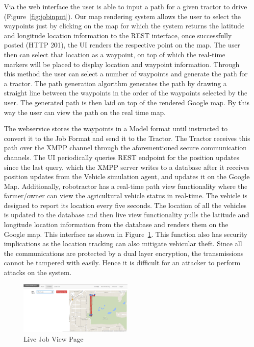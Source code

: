 \documentclass[conference,12pt]{IEEEtran}
\begin{document}
Via the web interface the user is able to input a path for a given tractor to
drive (Figure~\ref{fig:jobinput}). Our map
rendering system allows the user to select the waypoints just by clicking on the
map for which the system returns the latitude and longitude location information
to the REST interface, once successfully posted (HTTP 201), the UI renders the
respective point on the map. The user then can select that location as a waypoint, on top of
which the real-time markers will be placed to display location and waypoint
information. Through this method the user can select a number of waypoints and
generate the path for a tractor. The path generation algorithm generates the
path by drawing a straight line between the waypoints in the order of the
waypoints selected by the user. The generated path is then laid on top of
the rendered Google map. By this way the user can view the path on the real time
map. 

The webservice stores the waypoints in a Model format until
instructed to convert it to the Job Format and send it to the Tractor.  The
Tractor receives this path over the XMPP channel through the
aforementioned secure communication channels. The UI periodically queries REST
endpoint for the position updates since the last query, which the XMPP server writes
to a database after it receives position updates from the Vehicle simulation
agent, and updates it on the Google Map. 
Additionally, robotractor has a real-time path view
functionality where the farmer/owner can view the agricultural vehicle status in
real-time. The vehicle is designed to report its location every five seconds.
The location of all the vehicles is updated to the database and then live view
functionality pulls the latitude and longitude location information from the
database and renders them on the Google map. This interface as shown in
Figure~\ref{fig:livejobpage}. This function also has security implications as
the location tracking can also mitigate vehicular theft. Since all the
communications are protected by a dual layer encryption, the transmissions cannot
be tampered with easily. Hence it is difficult for an attacker to perform
attacks on the system. 


\begin{figure}
\centering
\includegraphics[width=0.5\textwidth]{Images/Picture6.png}
\caption{Live Job View Page}
\label{fig:livejobpage}
\end{figure}
\end{document}
